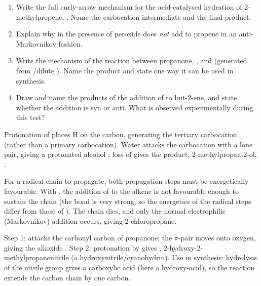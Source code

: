 \documentclass[11pt]{article}
\newcounter{popsec}
\newcounter{popsub}
\newcommand{\courssub}[1]{%
  \stepcounter{popsub}%
  \par\vspace{9pt}\noindent{\popxbold\fontsize{11.5}{13}\selectfont\color{popink}{\color{poporange}\thepopsec.\thepopsub}\hspace{6pt}#1}\par\nopagebreak\vspace{4pt}
}
\begin{document}
\courssub{Exercises}

\begin{exercice}[Practice]
\begin{enumerate}
\item Write the full curly-arrow mechanism for the acid-catalysed hydration of 2-methylpropene, . Name the carbocation intermediate and the final product.
\item Explain why  in the presence of peroxide does \emph{not} add to propene in an anti-Markovnikov fashion.
\item Write the mechanism of the reaction between propanone, , and  (generated from /dilute ). Name the product and state one way it can be used in synthesis.
\item Draw and name the products of the addition of  to but-2-ene, and state whether the addition is syn or anti. What is observed experimentally during this test?
\end{enumerate}
\end{exercice}

\courssub{Answers}

\begin{corrige}[Exercise 1]
Protonation of  places H on the  carbon, generating the tertiary carbocation  (rather than a primary carbocation). Water attacks the carbocation with a lone pair, giving a protonated alcohol ; loss of  gives the product, 2-methylpropan-2-ol, .
\end{corrige}

\begin{corrige}[Exercise 2]
For a radical chain to propagate, both propagation steps must be energetically favourable. With , the addition of  to the alkene is not favourable enough to sustain the chain (the  bond is very strong, so the energetics of the radical steps differ from those of ). The chain dies, and only the normal electrophilic (Markovnikov) addition occurs, giving 2-chloropropane.
\end{corrige}

\begin{corrige}[Exercise 3]
Step 1:  attacks the carbonyl carbon of propanone; the  $\pi$-pair moves onto oxygen, giving the alkoxide . Step 2: protonation by  gives , 2-hydroxy-2-methylpropanenitrile (a hydroxynitrile/cyanohydrin). Use in synthesis: hydrolysis of the nitrile group gives a carboxylic acid (here a hydroxy-acid), so the reaction extends the carbon chain by one carbon.
\end{corrige}
\end{document}

